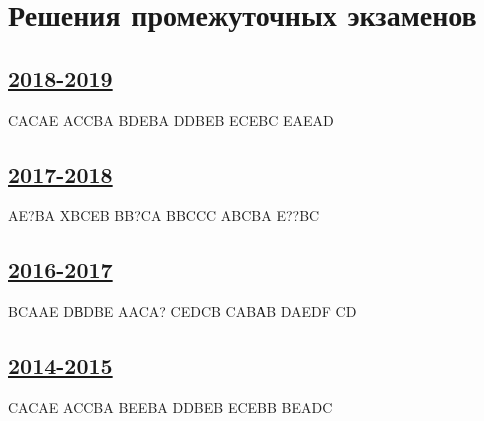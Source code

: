 \thispagestyle{empty}
\section{Решения промежуточных экзаменов}

\subsection[2018-2019]{\hyperref[sec:midterm_exam_2018_2019]{2018-2019}}
\label{sec:sol_midterm_exam_2018_2019}

CACAE ACCBA BDEBA DDBEB ECEBC EAEAD

\subsection[2017-2018]{\hyperref[sec:midterm_exam_2017_2018]{2017-2018}}
\label{sec:sol_midterm_exam_2017_2018}

AE?BA XBCEB BB?CA BBCCC ABCBA E??BC

\subsection[2016-2017]{\hyperref[sec:midterm_exam_2016_2017]{2016-2017}}
\label{sec:sol_midterm_exam_2016_2017}

BCAAE DВDBE AACA? CEDCB CABАB DAEDF CD

\subsection[2014-2015]{\hyperref[sec:midterm_exam_2014_2015]{2014-2015}}
\label{sec:sol_midterm_exam_2014_2015}

CACAE ACCBA BEEBA DDBEB ECEBB BEADC
